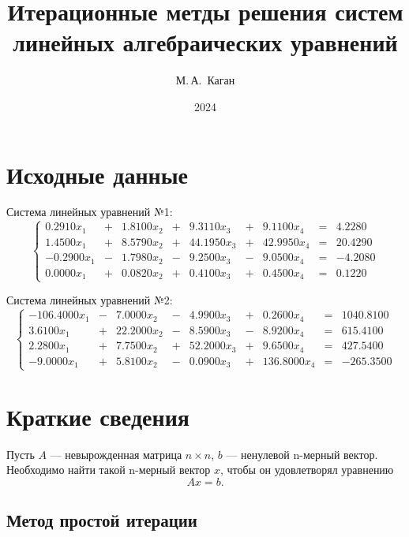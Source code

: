 \documentclass[12pt, a4paper]{article}
\title{Итерационные метды решения систем линейных алгебраических уравнений}
\author{М.\,А.~Каган}
\date{2024}
\begin{document}
	\maketitle
	\tableofcontents
	
	\newpage
	
	\section{Исходные данные}
	
	Система линейных уравнений №1:
	\[
	\left \{ \begin{array}{ccccccccc}
		0.2910 x_1  & +   &   1.8100 x_2 & +   &     9.3110 x_3 & +    &    9.1100 x_4 & = & 4.2280\\
		1.4500  x_1 & + &     8.5790 x_2 & +  &     44.1950 x_3  & +  &    42.9950 x_4  & = & 20.4290\\
		-0.2900 x_1  & - &     1.7980 x_2 & - &      9.2500 x_3   & - &    9.0500 x_4 & = & -4.2080  \\
		0.0000  x_1  & + &     0.0820 x_2  & +  &     0.4100 x_3 & +  &      0.4500 x_4 & = & 0.1220
	\end{array}	\right.
	\]
	 
	Система линейных уравнений №2:
	 \[
	 \left \{ \begin{array}{ccccccccc}
	 -106.4000 x_1 & - & 7.0000 x_2 & - & 4.9900 x_3 & + & 0.2600 x_4 & = & 1040.8100\\
	3.6100 x_1 & + & 22.2000 x_2 & - & 8.5900 x_3 & - & 8.9200 x_4 & = & 615.4100 \\
	 2.2800 x_1 & + & 7.7500 x_2 & + & 52.2000 x_3 & + & 9.6500 x_4 & = & 427.5400 \\
	 -9.0000 x_1 & + & 5.8100 x_2 & - & 0.0900 x_3 & + & 136.8000 x_4 & = & -265.3500
	\end{array}	\right.
	 \]  
	\section{Краткие сведения}
	Пусть $A$ --- невырожденная матрица $n \times n$, $b$ --- ненулевой n-мерный вектор. Необходимо найти такой n-мерный вектор $x$, чтобы он удовлетворял уравнению
	\begin{equation}
		\label{eq}
		A x = b.
	\end{equation}
  
	\subsection{Метод простой итерации}
	
\end{document}
